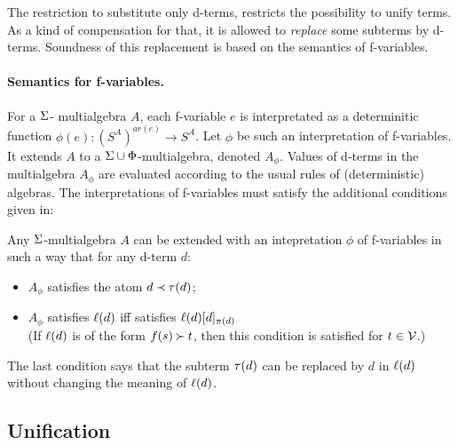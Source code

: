 The restriction to substitute only d-terms, restricts the possibility to
unify terms. As a kind of compensation for that, it  
 is allowed to {\em replace} some subterms by d-terms.
Soundness of this replacement
is based on the semantics of f-variables.
%
\paragraph{Semantics for f-variables.\ }
For a  \(\Sigma\)- multialgebra $A$, each f-variable $e$ is
interpretated as a determinitic function \(\phi(e): (S^A)^{ar(e)}\to S^A\).
Let $\phi$ be such an interpretation of f-variables. It
extends  $A$ to a \(\Sigma\cup\Phi\)-multialgebra, denoted
 \(A_\phi\).  Values of d-terms in the multialgebra \(A_\phi\) are
evaluated according to the usual rules of (deterministic) algebras.  
The interpretations of f-variables must satisfy the additional conditions
given in:

\begin{lemma}\label{le:f-variables}
Any \(\Sigma\)-multialgebra $A$ can be extended with an intepretation $\phi$
of f-variables in such a way that for any d-term $d:$ 
\begin{itemize}\smallerspaces
\item $A_\phi$ satisfies the atom \(d\mathbin{\prec} \tau(d)\);
\item $A_\phi$ satisfies \(\ell(d)\) iff satisfies \(\ell(d) [d]_{\pi(d)}\) \\
(If \(\ell(d)\) is of the form $f(s)\mathbin{\succ} t$, then this condition is satisfied
for $t\in{\cal V}$.)
\vspace{-2ex}
\end{itemize}
\end{lemma}
The last condition says that the subterm \(\tau(d)\) can be replaced by $d$ in
\(\ell(d)\) without changing the meaning of \(\ell(d)\). 

\subsection{Unification}

